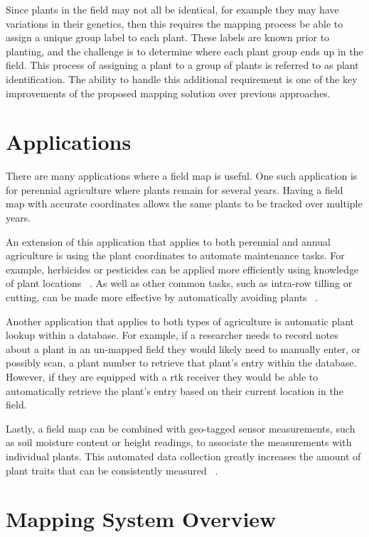 Since plants in the field may not all be identical, for example they may have variations in their genetics, then this requires the mapping process be able to assign a unique group label to each plant.  These labels are known prior to planting, and the challenge is to determine where each plant group ends up in the field.  This process of assigning a plant to a group of plants is referred to as plant identification. The ability to handle this additional requirement is one of the key improvements of the proposed mapping solution over previous approaches.

\section{Applications}

There are many applications where a field map is useful.  One such application is for perennial agriculture where plants remain for several years.  Having a field map with accurate coordinates allows the same plants to be tracked over multiple years.

An extension of this application that applies to both perennial and annual agriculture is using the plant coordinates to automate maintenance tasks.  For example, herbicides or pesticides can be applied more efficiently using knowledge of plant locations ~\citep{Carballido:2013}. As well as other common tasks, such as intra-row tilling or cutting, can be made more effective by automatically avoiding plants ~\citep{Bakker:2010}.  

Another application that applies to both types of agriculture is automatic plant lookup within a database.  For example, if a researcher needs to record notes about a plant in an un-mapped field they would likely need to manually enter, or possibly scan, a plant number to retrieve that plant's entry within the database.  However, if they are equipped with a \ac{rtk} receiver they would be able to automatically retrieve the plant's entry based on their current location in the field. 

Lastly, a field map can be combined with geo-tagged sensor measurements, such as soil moisture content or height readings, to associate the measurements with individual plants.  This automated data collection greatly increases the amount of plant traits that can be consistently measured ~\citep{Ruckelshausen:2009}.

\section{Mapping System Overview} 

